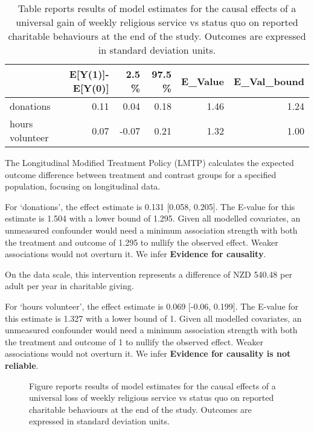 \documentclass[
  single column]{article}
\begin{document}
\begin{longtable}[]{@{}lrrrrr@{}}

\caption{\label{tbl-1_2}Table reports results of model estimates for the
causal effects of a universal gain of weekly religious service vs status
quo on reported charitable behaviours at the end of the study. Outcomes
are expressed in standard deviation units.}

\tabularnewline

\toprule\noalign{}
& E{[}Y(1){]}-E{[}Y(0){]} & 2.5 \% & 97.5 \% & E\_Value &
E\_Val\_bound \\
\midrule\noalign{}
\endhead
\bottomrule\noalign{}
\endlastfoot
donations & 0.11 & 0.04 & 0.18 & 1.46 & 1.24 \\
hours volunteer & 0.07 & -0.07 & 0.21 & 1.32 & 1.00 \\

\end{longtable}

The Longitudinal Modified Treatment Policy (LMTP) calculates the
expected outcome difference between treatment and contrast groups for a
specified population, focusing on longitudinal data.

For `donations', the effect estimate is 0.131 {[}0.058, 0.205{]}. The
E-value for this estimate is 1.504 with a lower bound of 1.295. Given
all modelled covariates, an unmeasured confounder would need a minimum
association strength with both the treatment and outcome of 1.295 to
nullify the observed effect. Weaker associations would not overturn it.
We infer \textbf{Evidence for causality}.

On the data scale, this intervention represents a difference of NZD
540.48 per adult per year in charitable giving.

For `hours volunteer', the effect estimate is 0.069 {[}-0.06, 0.199{]}.
The E-value for this estimate is 1.327 with a lower bound of 1. Given
all modelled covariates, an unmeasured confounder would need a minimum
association strength with both the treatment and outcome of 1 to nullify
the observed effect. Weaker associations would not overturn it. We infer
\textbf{Evidence for causality is not reliable}.

\newpage{}

\begin{figure}


\caption{\label{fig-1_3}Figure reports results of model estimates for
the causal effects of a universal loss of weekly religious service vs
status quo on reported charitable behaviours at the end of the study.
Outcomes are expressed in standard deviation units.}

\end{figure}%
\end{document}

